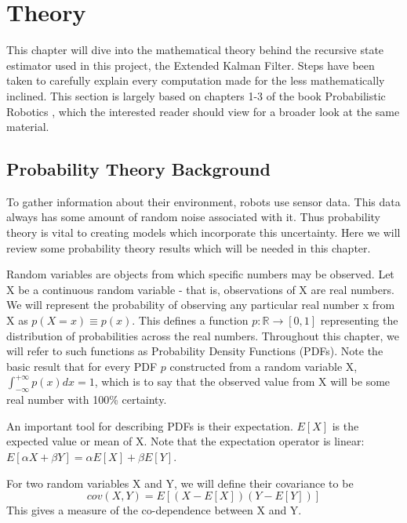 \newcommand{\bel}{\mathrm{bel}}

\chapter{Theory}

This chapter will dive into the mathematical theory behind the recursive state estimator used in this project, the Extended Kalman Filter. Steps have been taken to carefully explain every computation made for the less mathematically inclined. This section is largely based on chapters 1-3 of the book Probabilistic Robotics \cite{probabilisticRobotics}, which the interested reader should view for a broader look at the same material. 

\section{Probability Theory Background} \label{sectionProbTheory}
To gather information about their environment, robots use sensor data. This data always has some amount of random noise associated with it. Thus probability theory is vital to creating models which incorporate  this uncertainty. Here we will review some probability theory results which will be needed in this chapter.

Random variables are objects from which specific numbers may be observed. Let X be a continuous random variable - that is, observations of X are real numbers. We will represent the probability of observing any particular real number x from X as \( p(X = x) \equiv p(x)\). This defines a function \(p: \mathbb{R} \to [0,1]\) representing the distribution of probabilities across the real numbers. Throughout this chapter, we will refer to such functions as Probability Density Functions (PDFs). Note the basic result that for every PDF \(p\) constructed from a random variable X, \(\int_{-\infty}^{+\infty} p(x)dx = 1\), which is to say that the observed value from X will be some real number with 100\% certainty.

An important tool for describing PDFs is their expectation. \(E[X]\) is the expected value or mean of X. Note that the expectation operator is linear: \(E[\alpha X + \beta Y] = \alpha E[X] + \beta E[Y]\).

For two random variables X and Y, we will define their covariance to be
\[
cov(X,Y) = E[(X - E[X])(Y - E[Y])]
\] This gives a measure of the co-dependence between X and Y.

